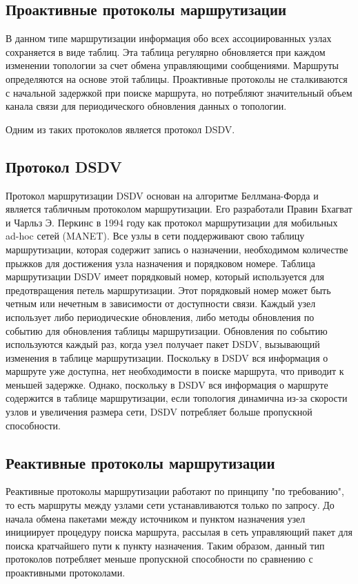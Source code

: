 \subsection*{Проактивные протоколы маршрутизации}

В данном типе маршрутизации информация обо всех ассоциированных узлах сохраняется в виде таблиц. Эта таблица регулярно обновляется при каждом изменении топологии за счет обмена управляющими сообщениями. Маршруты определяются на основе этой таблицы. Проактивные протоколы не сталкиваются с начальной задержкой при поиске маршрута, но потребляют значительный объем канала связи для периодического обновления данных о топологии.

Одним из таких протоколов является протокол DSDV.

\subsection*{Протокол DSDV}

Протокол маршрутизации DSDV основан на алгоритме Беллмана-Форда и является табличным протоколом маршрутизации. Его разработали Правин Бхагват и Чарльз Э. Перкинс в 1994 году как протокол маршрутизации для мобильных ad-hoc сетей (MANET). Все узлы в сети поддерживают свою таблицу маршрутизации, которая содержит запись о назначении, необходимом количестве прыжков для достижения узла назначения и порядковом номере. Таблица маршрутизации DSDV имеет порядковый номер, который используется для предотвращения петель маршрутизации. Этот порядковый номер может быть четным или нечетным в зависимости от доступности связи. Каждый узел использует либо периодические обновления, либо методы обновления по событию для обновления таблицы маршрутизации. Обновления по событию используются каждый раз, когда узел получает пакет DSDV, вызывающий изменения в таблице маршрутизации. Поскольку в DSDV вся информация о маршруте уже доступна, нет необходимости в поиске маршрута, что приводит к меньшей задержке. Однако, поскольку в DSDV вся информация о маршруте содержится в таблице маршрутизации, если топология динамична из-за скорости узлов и увеличения размера сети, DSDV потребляет больше пропускной способности.

\subsection*{Реактивные протоколы маршрутизации}

Реактивные протоколы маршрутизации работают по принципу "по требованию", то есть маршруты между узлами сети устанавливаются только по запросу. До начала обмена пакетами между источником и пунктом назначения узел инициирует процедуру поиска маршрута, рассылая в сеть управляющий пакет для поиска кратчайшего пути к пункту назначения. Таким образом, данный тип протоколов потребляет меньше пропускной способности по сравнению с проактивными протоколами.

